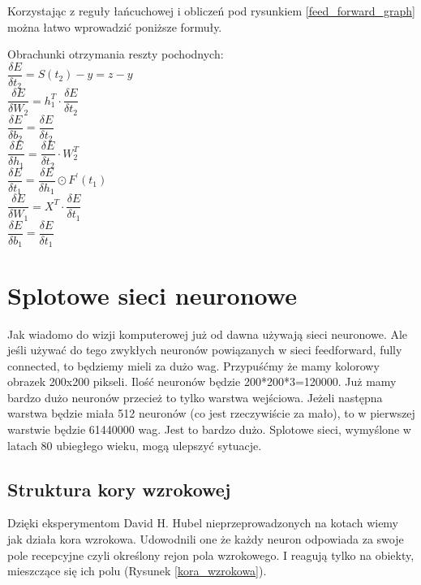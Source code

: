 \documentclass{article}
\begin{document}
\begin{flushleft}
Korzystając z reguły łańcuchowej i obliczeń pod rysunkiem \ref{feed_forward_graph} można łatwo wprowadzić poniższe formuły.
\vspace{0.5cm}
	
Obrachunki otrzymania reszty pochodnych:\\
$\dfrac{\delta E}{\delta t_2} = S(t_2)-y=z-y$\\
\vspace{5mm}
$\dfrac{\delta E}{\delta W_2} = h_1^T \cdot \dfrac{\delta E}{\delta t_2}$\\
$\dfrac{\delta E}{\delta b_2} = \dfrac{\delta E}{\delta t_2}$\\
\vspace{5mm}
$\dfrac{\delta E}{\delta h_1} = \dfrac{\delta E}{\delta t_2} \cdot W_2^T$\\
$\dfrac{\delta E}{\delta t_1} = \dfrac{\delta E}{\delta h_1} \odot F^\prime (t_1)$\\
\vspace{5mm}
$\dfrac{\delta E}{\delta W_1} = X^T \cdot \dfrac{\delta E}{\delta t_1}$\\
$\dfrac{\delta E}{\delta b_1} = \dfrac{\delta E}{\delta t_1}$
\end{flushleft}

\section{Splotowe sieci neuronowe}
Jak wiadomo do wizji komputerowej już od dawna używają sieci neuronowe. Ale jeśli używać do tego zwykłych neuronów powiązanych w sieci feedforward, fully connected, to będziemy mieli za dużo wag. Przypuśćmy że mamy kolorowy obrazek 200x200 pikseli. Ilość neuronów będzie 200*200*3=120000. Już mamy bardzo dużo neuronów przecież to tylko warstwa wejściowa. Jeżeli następna warstwa będzie miała 512 neuronów (co jest rzeczywiście za mało), to w pierwszej warstwie będzie 61440000 wag. Jest to bardzo dużo. 
Splotowe sieci, wymyślone w latach 80 ubiegłego wieku, mogą ulepszyć sytuacje.

\subsection{Struktura kory wzrokowej}
Dzięki eksperymentom David H. Hubel nieprzeprowadzonych na kotach wiemy jak działa kora wzrokowa.\cite{David_1958} \cite{David_1959}
Udowodnili one że każdy neuron odpowiada za swoje pole recepcyjne czyli określony rejon pola wzrokowego. I reagują tylko na obiekty, mieszczące się ich polu (Rysunek \ref{kora_wzrokowa}). \cite{geron}
\end{document}
